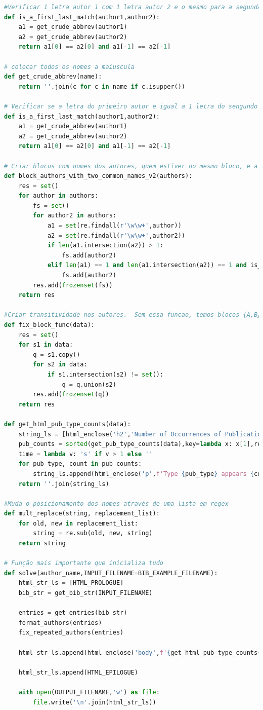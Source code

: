 \documentclass[11pt,a4paper]{report}
\begin{document}
\begin{lstlisting}[language=python]
#Verificar 1 letra autor 1 com 1 letra autor 2 e o mesmo para a segunda
def is_a_first_last_match(author1,author2):
    a1 = get_crude_abbrev(author1)
    a2 = get_crude_abbrev(author2)
    return a1[0] == a2[0] and a1[-1] == a2[-1]

# colocar todos os nomes a maiuscula
def get_crude_abbrev(name):
    return ''.join(c for c in name if c.isupper())

# Verificar se a letra do primeiro autor e igual a 1 letra do sengundo autor e o mesmo para a 2 letra 
def is_a_first_last_match(author1,author2):
    a1 = get_crude_abbrev(author1)
    a2 = get_crude_abbrev(author2)
    return a1[0] == a2[0] and a1[-1] == a2[-1]

# Criar blocos com nomes dos autores, quem estiver no mesmo bloco, e a mesma pessoa.
def block_authors_with_two_common_names_v2(authors):
    res = set()
    for author in authors:
        fs = set()
        for author2 in authors:
            a1 = set(re.findall(r'\w\w+',author))
            a2 = set(re.findall(r'\w\w+',author2))
            if len(a1.intersection(a2)) > 1:
                fs.add(author2)
            elif len(a1) == 1 and len(a1.intersection(a2)) == 1 and is_a_first_last_match(author,author2):
                fs.add(author2)
        res.add(frozenset(fs))
    return res

#Criar transitividade nos autores.  Sem essa funcao, temos blocos {A,B} e {B,C} Depois dessa funcao, vamos ter {A,B,C}
def fix_block_func(data):
    res = set()
    for s1 in data:
        q = s1.copy()
        for s2 in data:
            if s1.intersection(s2) != set():
                q = q.union(s2)
        res.add(frozenset(q))
    return res

def get_html_pub_type_counts(data):
    string_ls = [html_enclose('h2','Number of Occurrences of Publication Types')]
    pub_counts = sorted(get_pub_type_counts(data),key=lambda x: x[1],reverse=True)
    time = lambda v: 's' if v > 1 else ''
    for pub_type, count in pub_counts:
        string_ls.append(html_enclose('p',f'Type {pub_type} appears {count} time{time(count)}'))
    return ''.join(string_ls)

#Muda o posicionamento dos nomes através de uma lista em regex
def mult_replace(string, replacement_list):
    for old, new in replacement_list:
        string = re.sub(old, new, string)
    return string

# Função mais importante que inicializa tudo
def solve(author_name,INPUT_FILENAME=BIB_EXAMPLE_FILENAME):
    html_str_ls = [HTML_PROLOGUE]
    bib_str = get_bib_str(INPUT_FILENAME)

    entries = get_entries(bib_str)
    format_authors(entries)
    fix_repeated_authors(entries)

    html_str_ls.append(html_enclose('body',f'{get_html_pub_type_counts(entries)}{get_html_common_pub_author(author_name,entries)}{get_html_pub_type_index(entries)}{get_html_author_index(entries)}'))

    html_str_ls.append(HTML_EPILOGUE)

    with open(OUTPUT_FILENAME,'w') as file:
        file.write('\n'.join(html_str_ls))

\end{lstlisting}
\end{document}
